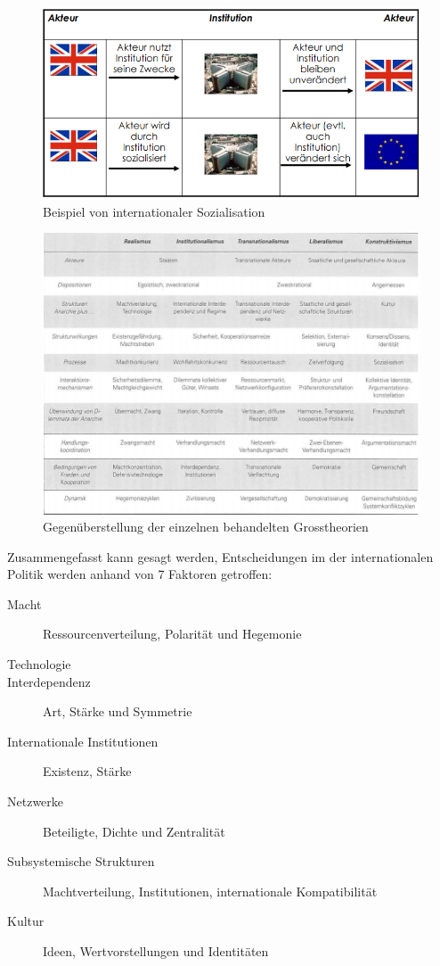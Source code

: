 \documentclass[a4paper, 11pt]{article}
\begin{document}
\begin{figure}[htb]
	\centering
	\includegraphics[keepaspectratio=true,height=15\baselineskip]{sozialisation.png}
	\caption{Beispiel von internationaler Sozialisation}
	\label{fig:sozialisation}
\end{figure}

\begin{landscape}
	\begin{figure}[htb]
		\centering
		\includegraphics[keepaspectratio=true,height=30\baselineskip]{Gegenueberstellung.png}
		\caption{Gegenüberstellung der einzelnen behandelten Grosstheorien}
		\label{fig:gegenueberstellung}
	\end{figure}
\end{landscape}

Zusammengefasst kann gesagt werden, Entscheidungen im der internationalen Politik werden anhand von 7 Faktoren getroffen:

\begin{description}
	\item [Macht] Ressourcenverteilung, Polarität und Hegemonie
	\item [Technologie]
	\item [Interdependenz] Art, Stärke und Symmetrie
	\item [Internationale Institutionen] Existenz, Stärke
	\item [Netzwerke] Beteiligte, Dichte und Zentralität
	\item [Subsystemische Strukturen] Machtverteilung, Institutionen, internationale Kompatibilität
	\item [Kultur] Ideen, Wertvorstellungen und Identitäten
\end{description}
\end{document}
